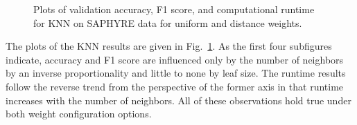 \documentclass[12pt]{uthesis-v12}  %
\begin{document}
\begin{figure}
	\hfill	
{}
						
\caption{Plots of validation accuracy, F1 score, and computational runtime for KNN on SAPHYRE data for uniform and distance weights.}
	\label{knn-saphyre}
	\end{figure}
	
The plots of the KNN results are given in Fig.~\ref{knn-saphyre}. As the first four subfigures indicate, accuracy and F1 score are influenced only by the number of neighbors by an inverse proportionality and little to none by leaf size. The runtime results follow the reverse trend from the perspective of the former axis in that runtime increases with the number of neighbors. All of these observations hold true under both weight configuration options. 
\end{document}
